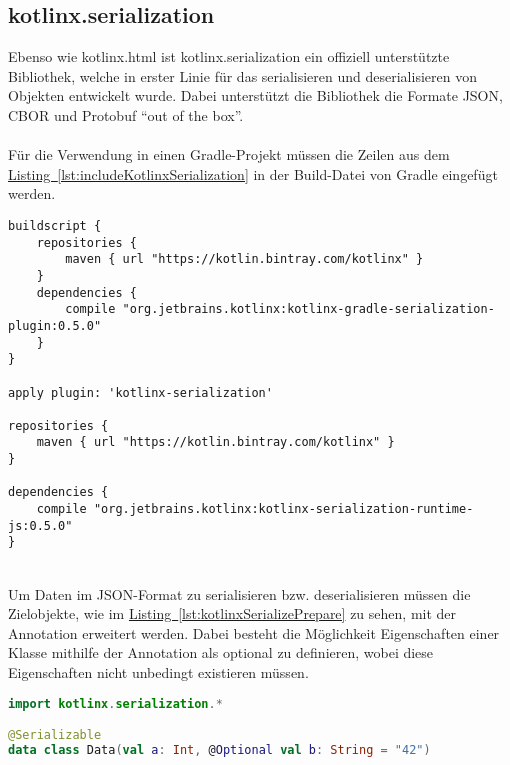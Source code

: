 \subsection{kotlinx.serialization}\label{sec:kotlinxSerialization}
Ebenso wie kotlinx.html ist kotlinx.serialization \cite{kotlinxSerialization} ein offiziell unterstützte Bibliothek, welche in erster Linie für das serialisieren und deserialisieren von Objekten entwickelt wurde. Dabei unterstützt die Bibliothek die Formate \gls{JSON}, \gls{CBOR} und \gls{Protobuf} \enquote{out of the box}.\\
\\
Für die Verwendung in einen Gradle-Projekt müssen die Zeilen aus dem \hyperref[lst:includeKotlinxSerialization]{Listing~\ref{lst:includeKotlinxSerialization}} in der Build-Datei von Gradle eingefügt werden.
\\
\begin{lstlisting}[style=lstStyleFramed, language=Gradle, caption={Einbindung der Bibliothek kotlinx.serialization mittels Gradle}, label=lst:includeKotlinxSerialization, float]
buildscript {
	repositories {
		maven { url "https://kotlin.bintray.com/kotlinx" }
	}
	dependencies {
		compile "org.jetbrains.kotlinx:kotlinx-gradle-serialization-plugin:0.5.0"
	}
}

apply plugin: 'kotlinx-serialization'

repositories {
	maven { url "https://kotlin.bintray.com/kotlinx" }
}

dependencies {
	compile "org.jetbrains.kotlinx:kotlinx-serialization-runtime-js:0.5.0"
}
\end{lstlisting}
\\
Um Daten im \gls{JSON}-Format zu serialisieren bzw. deserialisieren müssen die Zielobjekte, wie im \hyperref[lst:kotlinxSerializePrepare]{Listing~\ref{lst:kotlinxSerializePrepare}} zu sehen, mit der Annotation  erweitert werden. Dabei besteht die Möglichkeit Eigenschaften einer Klasse mithilfe der Annotation  als optional zu definieren, wobei diese Eigenschaften nicht unbedingt existieren müssen.
\\
\begin{lstlisting}[style=lstStyleFramed, language=Kotlin, caption={Beispiel: Model-Erweiterung für Unterstützung der Kotlinx.serialization Bibliothek (verändert nach \cite{kotlinxSerializationExample})}, label=lst:kotlinxSerializePrepare, float]
import kotlinx.serialization.*

@Serializable
data class Data(val a: Int, @Optional val b: String = "42")
\end{lstlisting}
